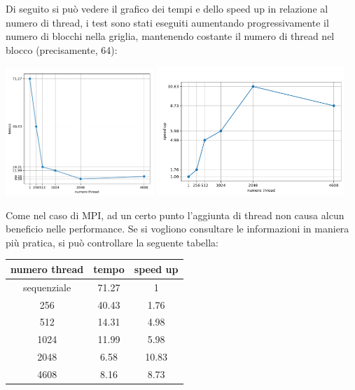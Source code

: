 \documentclass[12pt,openany]{report}
\begin{document}
Di seguito si può vedere il grafico dei tempi e dello speed up in relazione al numero di thread, i test sono stati eseguiti aumentando progressivamente il numero di blocchi nella griglia, mantenendo costante il numero di thread nel blocco (precisamente, 64):
\begin{center}
    \includegraphics[width=0.42\textwidth ]{images/tempiCUDA.pdf}
    \includegraphics[width=0.53\textwidth ]{images/speedupCUDA.pdf}
\end{center}\newpage
Come nel caso di MPI, ad un certo punto l'aggiunta di thread non causa alcun beneficio nelle performance. Se si vogliono consultare le informazioni in maniera più pratica, si può controllare la seguente tabella:
\begin{center}
    \begin{tabular}{|c|c|c|}
        \hline
        \rowcolor[HTML]{EFEFEF} 
        numero thread & tempo     & speed up \\ \hline
        sequenziale      & 71.27     & 1       \\ \hline
        256              & 40.43     & 1.76    \\ \hline
        512              & 14.31     & 4.98    \\ \hline
        1024             & 11.99     & 5.98    \\ \hline
        2048             & 6.58      & 10.83   \\ \hline
        4608             & 8.16      & 8.73    \\ \hline
        \end{tabular}
\end{center}
\newpage 
\end{document}
